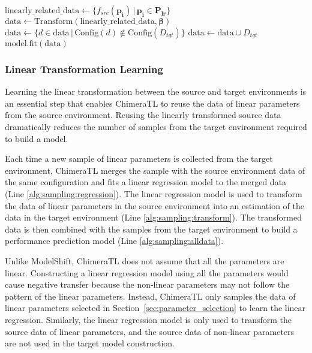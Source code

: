 \begin{algorithm}
\begin{algorithmic}[1]
    \State

      \State $\text{linearly\_related\_data} \gets \{f_{src}(\boldsymbol{p_i}) \,|\, \boldsymbol{p_i} \in \boldsymbol{P_{lr}}\}$
      \State $\text{data} \gets \text{Transform}(\text{linearly\_related\_data}, \boldsymbol{\beta})$\label{alg:sampling:transform}
      \State $\text{data} \gets \{d \in \text{data} \,|\, \text{Config}(d) \notin \text{Config}(D_{tgt})\}$
      \State $\text{data} \gets \text{data} \cup D_{tgt}$\label{alg:sampling:alldata}
      \State $\text{model.fit}(\text{data})$
    \EndFunction
    
  \end{algorithmic}
\end{algorithm}

\subsubsection{Linear Transformation Learning}
Learning the linear transformation between the source and target environments is an essential step that enables ChimeraTL to reuse the data of linear parameters from the source environment.
Reusing the linearly transformed source data dramatically reduces the number of samples from the target environment required to build a model.

Each time a new sample of linear parameters is collected from the target environment, ChimeraTL merges the sample with the source environment data of the same configuration and fits a linear regression model to the merged data (Line \ref{alg:sampling:regression}).
The linear regression model is used to transform the data of linear parameters in the source environment into an estimation of the data in the target environment (Line \ref{alg:sampling:transform}).
The transformed data is then combined with the samples from the target environment to build a performance prediction model (Line \ref{alg:sampling:alldata}).

Unlike ModelShift\cite{Valov}, ChimeraTL does not assume that all the parameters are linear.
Constructing a linear regression model using all the parameters would cause negative transfer because the non-linear parameters may not follow the pattern of the linear parameters.
Instead, ChimeraTL only samples the data of linear parameters selected in Section~\ref{sec:parameter_selection} to learn the linear regression.
Similarly, the linear regression model is only used to transform the source data of linear parameters, and the source data of non-linear parameters are not used in the target model construction.

